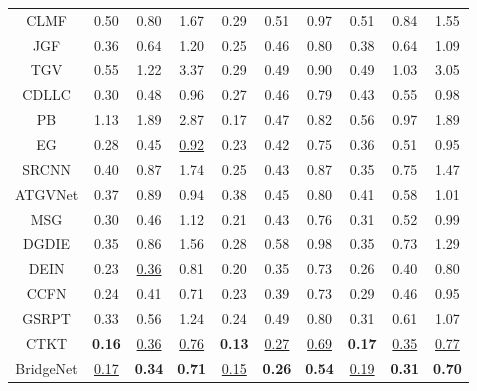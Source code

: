 {\begin{longtable}{c|ccc|ccc|ccc}
CLMF \cite{LuSMLD12}     & 0.50 & 0.80       & 1.67          & 0.29 & 0.51 & 0.97 & 0.51 & 0.84 & 1.55          \\ 
JGF \cite{0001TT13}      & 0.36 & 0.64       & 1.20          & 0.25 & 0.46 & 0.80 & 0.38 & 0.64 & 1.09          \\ 
TGV \cite{DBLP:conf/iccv/FerstlRRRB13}      & 0.55 & 1.22       & 3.37          & 0.29 & 0.49 & 0.90 & 0.49 & 1.03 & 3.05          \\ 
CDLLC \cite{DBLP:conf/icmcs/XieCFS14}   & 0.30 & 0.48       & 0.96          & 0.27 & 0.46 & 0.79 & 0.43 & 0.55 & 0.98          \\ 
PB \cite{DBLP:conf/eccv/AodhaCNB12}      & 1.13 & 1.89       & 2.87          & 0.17 & 0.47 & 0.82 & 0.56 & 0.97 & 1.89          \\ 
EG \cite{DBLP:journals/tip/XieFS16}      & 0.28 & 0.45       & \uline{0.92}    & 0.23 & 0.42 & 0.75 & 0.36 & 0.51 & 0.95          \\ \hline
SRCNN \cite{DBLP:conf/eccv/DongLHT14}   & 0.40 & 0.87       & 1.74          & 0.25 & 0.43 & 0.87 & 0.35 & 0.75 & 1.47          \\
ATGVNet \cite{DBLP:conf/eccv/RieglerRB16} & 0.37 & 0.89       & 0.94          & 0.38 & 0.45 & 0.80 & 0.41 & 0.58 & 1.01 \\
MSG \cite{HuiLT16}    & 0.30 & 0.46       & 1.12          & 0.21 & 0.43 & 0.76 & 0.31 & 0.52 & 0.99          \\
DGDIE \cite{DBLP:conf/cvpr/GuZGCCZ17}   & 0.35 & 0.86       & 1.56          & 0.28 & 0.58 & 0.98 & 0.35 & 0.73 & 1.29          \\
DEIN \cite{DBLP:conf/icassp/YeDL18}      & 0.23 & \uline{0.36} & 0.81 & 0.20 & 0.35 & 0.73 & 0.26 & 0.40 & 0.80          \\
CCFN \cite{WenSLLF19}   & 0.24 & 0.41       & 0.71          & 0.23 & 0.39 & 0.73 & 0.29 & 0.46 & 0.95          \\
GSRPT \cite{LutioDWS19}   & 0.33 & 0.56       & 1.24          & 0.24 & 0.49 & 0.80 & 0.31 & 0.61 & 1.07          \\
CTKT \cite{Sun2021cvpr}      & \textbf{0.16} & \uline{0.36}    & \uline{0.76}    & \textbf{0.13} & \uline{0.27}    & \uline{0.69}    & \textbf{0.17} & \uline{0.35}    & \uline{0.77}          \\
BridgeNet         & \uline{0.17}    & \textbf{0.34} & \textbf{0.71} & \uline{0.15}    & \textbf{0.26} & \textbf{0.54} & \uline{0.19}    & \textbf{0.31} &  \textbf{0.70}\\
\bottomrule[1.5pt]
\end{longtable}}

